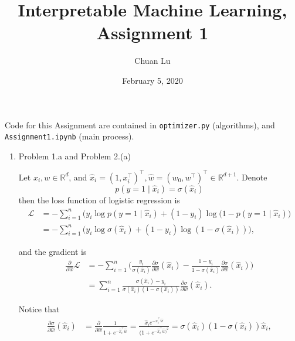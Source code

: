\documentclass{article}%
\begin{document}
\title{Interpretable Machine Learning, Assignment 1}
\author{Chuan Lu}
\date{February 5, 2020}
\maketitle

\newcommand{\hxi}{\hat{x}_i}
\newcommand{\hw}{\hat{w}}

Code for this Assignment are contained in \texttt{optimizer.py} (algorithms), and \texttt{Assignment1.ipynb} (main process).

\begin{enumerate}

\item Problem 1.a and Problem 2.(a)

Let $x_i, w\in\mathbb{R}^d $, and $\hxi = (1, x_i^\top)^\top ,\hw = (w_0, w^\top)^\top \in\mathbb{R}^{d+1} $. Denote
\begin{equation}
p(y = 1\mid \hxi) = \sigma(\hxi)
\end{equation}
then the loss function of logistic regression is
\begin{equation}
\begin{aligned}
\mathcal{L} &= -\sum_{i=1}^{n}\Big ( y_i \log p(y = 1 \mid \hxi) + (1-y_i)\log (1- p(y = 1 \mid \hxi)\Big ) \\
&= -\sum_{i=1}^{n} \Big( y_i \log\sigma(\hxi) + (1-y_i)\log(1-\sigma(\hxi))\Big),
\end{aligned}
\end{equation}

and the gradient is
\begin{equation}
\begin{aligned}
\frac{\partial}{\partial \hw}\mathcal{L} &= -\sum_{i=1}^{n} \Big( \frac{y_i}{\sigma(\hxi)}\frac{\partial \sigma}{\partial \hw}(\hxi) - \frac{1-y_i}{1-\sigma(\hxi)}\frac{\partial \sigma}{\partial \hw}(\hxi)\Big) \\
&= \sum_{i=1}^{n}\frac{\sigma(\hxi)-y_i}{\sigma(\hxi)(1-\sigma(\hxi))}\frac{\partial \sigma}{\partial \hw}(\hxi).
\end{aligned}
\end{equation}

Notice that
\begin{equation}
\begin{aligned}
\frac{\partial \sigma}{\partial \hw}(\hxi) &= \frac{\partial}{\partial \hw}\frac{1}{1+e^{-\hxi^\top \hw}} = \frac{\hxi e^{-\hxi^\top \hw}}{(1+e^{-\hxi^\top \hw)^2}} = \sigma(\hxi)(1-\sigma(\hxi))\hxi,
\end{aligned}
\end{equation}


\end{enumerate}
\end{document}
